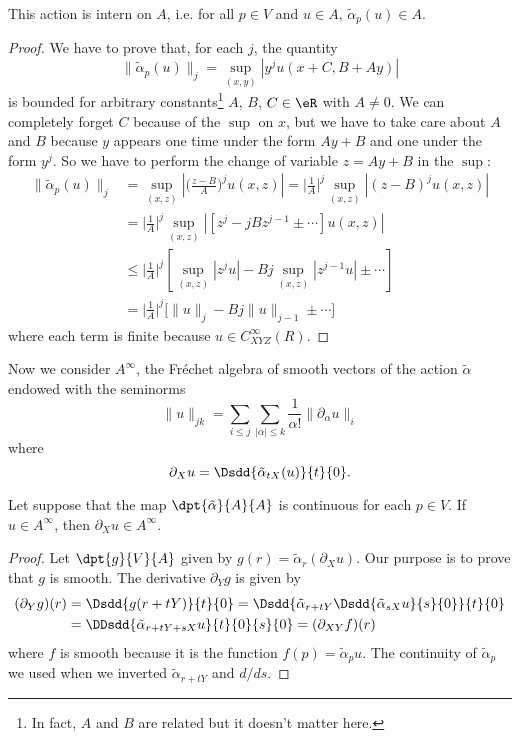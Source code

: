 \begin{lemma}
This action is intern on $A$, i.e. for all $p\in V$ and $u\in A$, $\tilde\alpha_p(u)\in A$.
\end{lemma}

\begin{proof}
We have to prove that, for each $j$, the quantity
\[ 
  \| \tilde\alpha_p(u) \|_j=\sup_{(x,y)}| y^ju(x+C,B+Ay) |
\]
is bounded for arbitrary constants\footnote{In fact, $A$ and $B$ are related but it doesn't matter here.} $A$, $B$, $C\in\eR$ with $A\neq 0$. We can completely forget $C$ because of the $\sup$ on $x$, but we have to take care about $A$ and $B$ because $y$ appears one time under the form $Ay+B$ and one under the form $y^j$. So we have to perform the change of variable $z=Ay+B$ in the $\sup$:
\begin{equation}
\begin{split}
 \| \tilde\alpha_p(u) \|_j	&=\sup_{(x,z)}\left|   \Big( \frac{ z-B }{ A } \Big)^ju(x,z)    \right|
				=\Big| \frac{1}{ A }  \Big|^j\sup_{(x,z)}| (z-B)^ju(x,z) |\\
				&=\Big| \frac{1}{ A }  \Big|^j\sup_{(x,z)}| [z^j-jBz^{j-1}\pm\cdots]u(x,z) |\\
				&\leq\Big| \frac{1}{ A }  \Big|^j\left[  \sup_{(x,z)}| z^ju |-Bj\sup_{(x,z)}| z^{j-1}u |\pm\cdots  \right]\\
				&=\Big| \frac{1}{ A }  \Big|^j\big[  \| u \|_j-Bj\| u \|_{j-1}\pm\cdots   \big]
\end{split}
\end{equation}
where each term is finite because $u\in C^{\infty}_{XYZ}(R)$.

\end{proof}

Now we consider $A^{\infty}$, the Fréchet algebra of smooth vectors of the action $\tilde\alpha$ endowed with the seminorms
 \begin{equation}
\| u \|_{jk}=\sum_{i\leq j}\sum_{| \alpha |\leq k}\frac{1}{ \alpha! }\| \partial_{\alpha}u \|_i
\end{equation}
where
\[ 
  \partial_Xu=\Dsdd{ \tilde\alpha_{tX}(u) }{t}{0}.
\]

\begin{lemma}
Let suppose that the map $\dpt{ \tilde \alpha }{ A }{ A }$ is continuous for each $p\in V$. If $u\in A^{\infty}$, then $\partial_Xu\in A^{\infty}$.
\end{lemma}

\begin{proof}
Let $\dpt{ g }{ V }{ A }$ given by $g(r)=\tilde\alpha_r(\partial_Xu)$. Our purpose is to prove that $g$ is smooth. The derivative $\partial_Yg$ is given by
\[ 
 \begin{split} 
	(\partial_Yg)(r)&=\Dsdd{ g(r+tY) }{t}{0}
			=\Dsdd{ \tilde\alpha_{r+tY} \Dsdd{ \tilde\alpha_{sX}u }{s}{0} }{t}{0}\\
			&=\DDsdd{ \tilde\alpha_{r+tY+sX}u }{t}{0}{s}{0}
			=(\partial_{XY}f)(r)
\end{split}
\]
where $f$ is smooth because it is the function $f(p)=\tilde\alpha_pu$. The continuity of $\tilde\alpha_p$ we used when we inverted $\tilde\alpha_{r+tY}$ and $d/ds$.

\end{proof}

